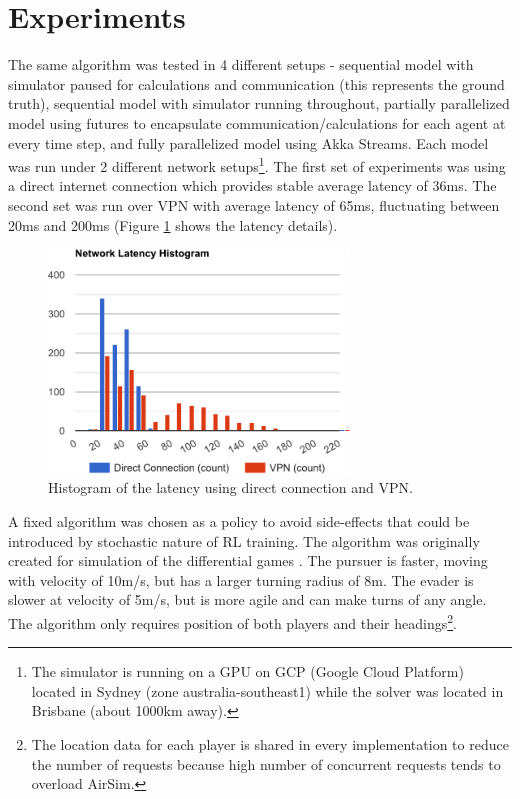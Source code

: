 \documentclass{article}
\let\cite\citep
\begin{document}
\section{Experiments}
The same algorithm was tested in 4 different setups - sequential model with simulator paused for calculations and communication (this represents the ground truth), sequential model with simulator running throughout, partially parallelized model using futures to encapsulate communication/calculations for each agent at every time step, and fully parallelized model using Akka Streams. Each model was run under 2 different network setups\footnote{The simulator is running on a GPU on GCP (Google Cloud Platform) located in Sydney (zone australia-southeast1) while the solver was located in Brisbane (about 1000km away).}. The first set of experiments was using a direct internet connection which provides stable average latency of 36ms. The second set was run over VPN with average latency of 65ms, fluctuating between 20ms and 200ms (Figure \ref{fig:network-latency} shows the latency details).

\begin{figure}
	\centering
	\includegraphics[width=8.0cm]{network-latency}
	\caption{Histogram of the latency using direct connection and VPN.}\label{fig:network-latency}
\end{figure}

A fixed algorithm was chosen as a policy to avoid side-effects that could be introduced by stochastic nature of RL training. The algorithm was originally created for simulation of the differential games \cite{redulla2018simulating}. The pursuer is faster, moving with velocity of 10m/s, but has a larger turning radius of 8m. The evader is slower at velocity of 5m/s, but is more agile and can make turns of any angle. The algorithm only requires position of both players and their headings\footnote{The location data for each player is shared in every implementation to reduce the number of requests because high number of concurrent requests tends to overload AirSim.}.
\end{document}
